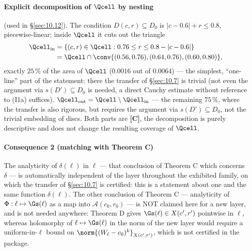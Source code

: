 \paragraph{Explicit decomposition of $\Qcell$ by nesting} (used in \S\ref{sec:10.12}). The condition
$D(c,r)\subseteq D_0$ is $|c-0.6|+r\le 0.8$, piecewise-linear; inside $\Qcell$ it cuts out the
triangle
\begin{align*}
\Qcell_{\mathrm{in}} &= \{ (c,r) \in \Qcell : 0.76 \le r \le 0.8 - |c-0.6| \} \\
&= \Qcell \cap \conv\{ (0.56,0.76), (0.64,0.76), (0.60,0.80) \} ,
\end{align*}
exactly $25\,\%$ of the area of $\Qcell$ ($0.0016$ out of $0.0064$) --- the simplest,
``one-line'' part of the statement: there the transfer of \S\ref{sec:10.7} is trivial
(not even the argument via $s(D')\subseteq D_0$ is needed, a direct Cauchy estimate
without reference to (I1a) suffices).
$\Qcell_{\mathrm{out}} = \Qcell\setminus \Qcell_{\mathrm{in}}$ --- the remaining $75\,\%$, where the transfer is also rigorous,
but requires the argument via $s(D')\subseteq D_0$, not the trivial embedding of discs.
Both parts are \textbf{[C]}, the decomposition is purely descriptive and does not
change the resulting coverage of $\Qcell$.

\paragraph{Consequence 2 (matching with Theorem C)} The analyticity of $\delta(\ell)$ in $\ell$
--- that conclusion of Theorem C which concerns $\delta$ --- is automatically independent
of the layer throughout the exhibited family, on which the transfer of \S\ref{sec:10.7} is
certified: this is a statement about one and the same function $\delta(\ell)$.
The other conclusion of Theorem C --- analyticity of $\Phi:\ell\mapsto\Gs(\ell)$ as a map
into $\mathcal A(c_0,r_0)$ --- is NOT claimed here for a new layer, and is not needed
anywhere: Theorem D gives $\Gs(\ell)\in X(c',r')$ pointwise in $\ell$, whereas holomorphy
of $\ell\mapsto\Gs(\ell)$ in the norm of the new layer would require a uniform-in-$\ell$
bound on $\norm{(W_\ell-c_0)^k}_{X(c',r')}$, which is not certified in the package.

